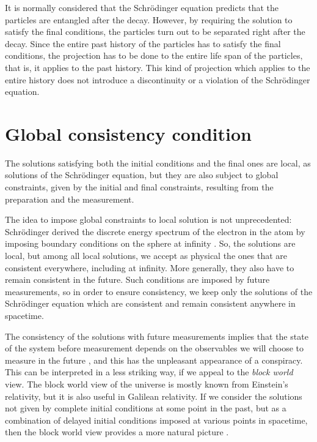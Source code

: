 \documentclass[11pt]{amsart}
\theoremstyle{definition}
\theoremstyle{plain}
\begin{document}
It is normally considered that the Schr\"odinger equation predicts that the particles are entangled after the decay. However, by requiring the solution to satisfy the final conditions, the particles turn out to be separated right after the decay. Since the entire past history of the particles has to satisfy the final conditions, the projection has to be done to the entire life span of the particles, that is, it applies to the past history. This kind of projection which applies to the entire history does not introduce a discontinuity or a violation of the Schr\"odinger equation.


\section{Global consistency condition}
\label{s:global_consistency}

The solutions satisfying both the initial conditions and the final ones are local, as solutions of the Schr\"odinger equation, but they are also subject to global constraints, given by the initial and final constraints, resulting from the preparation and the measurement.

The idea to impose global constraints to local solution is not unprecedented: Schr\"odinger derived the discrete energy spectrum of the electron in the atom by imposing boundary conditions on the sphere at infinity \cite{Sch26}. So, the solutions are local, but among all local solutions, we accept as physical the ones that are consistent everywhere, including at infinity. More generally, they also have to remain consistent in the future. Such conditions are imposed by future measurements, so in order to ensure consistency, we keep only the solutions of the Schr\"odinger equation which are consistent and remain consistent anywhere in spacetime.

The consistency of the solutions with future measurements implies that the state of the system before measurement depends on the observables we will choose to measure in the future \cite{Sto12QMb}, and this has the unpleasant appearance of a conspiracy. This can be interpreted in a less striking way, if we appeal to the \emph{block world} view. The block world view of the universe is mostly known from Einstein's relativity, but it is also useful in Galilean relativity. If we consider the solutions not given by complete initial conditions at some point in the past, but as a combination of delayed initial conditions imposed at various points in spacetime, then the block world view provides a more natural picture \cite{Sto12QMa,Sto12QMc,Sto13bSpringer}.
\end{document}
